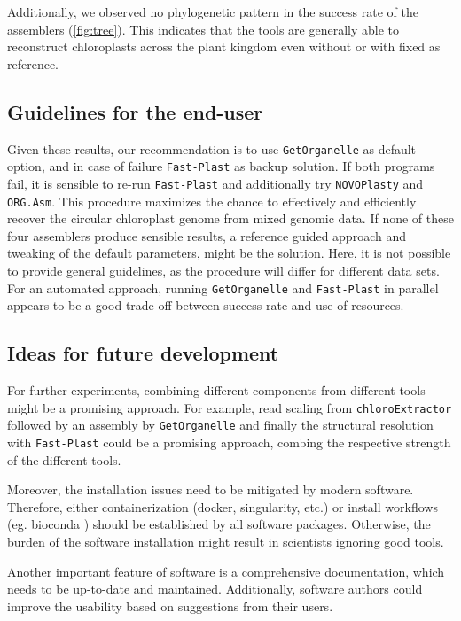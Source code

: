 \documentclass{bmcart}
\newcounter{todocounter}
\newcommand{\ak}[1]
{\stepcounter{todocounter}
 \todo[color=green!40,author=Arthur]{\thetodocounter: #1}
 }
\newcommand{\formatprogramnames}[1]{\texttt{#1}}
\newcommand{\ce}{\formatprogramnames{chloroExtractor}}
\newcommand{\oa}{\formatprogramnames{ORG.Asm}}
\newcommand{\fp}{\formatprogramnames{Fast-Plast}}
\newcommand{\np}{\formatprogramnames{NOVOPlasty}}
\newcommand{\go}{\formatprogramnames{GetOrganelle}}
\begin{document}
Additionally, we observed no phylogenetic pattern in the success rate of the assemblers (\cref{fig:tree}).
This indicates that the tools are generally able to reconstruct chloroplasts across the plant kingdom even without or with fixed  as reference.

\subsection*{Guidelines for the end-user}
Given these results, our recommendation is to use \go{} as default option, and in case of failure \fp{} as backup solution.
If both programs fail, it is sensible to re-run \fp{} and additionally try \np{} and \oa{}.
This procedure maximizes the chance to effectively and efficiently recover the circular chloroplast genome from mixed genomic data.
If none of these four assemblers produce sensible results, a reference guided approach and tweaking of the default parameters, might be the solution.
Here, it is not possible to provide general guidelines, as the procedure will differ for different data sets.
For an automated approach, running \go{} and \fp{} in parallel appears to be a good trade-off between success rate and use of resources.

\subsection*{Ideas for future development}
For further experiments, combining different components from different tools might be a promising approach.
For example, read scaling from \ce{} followed by an assembly by \go{} and finally the structural resolution with \fp{} could be a promising approach, combing the respective strength of the different tools.

Moreover, the installation issues need to be mitigated by modern software.
Therefore, either containerization (docker, singularity, etc.) or install workflows (eg. bioconda \cite{gruening2018}) should be established by all software packages.
Otherwise, the burden of the software installation might result in scientists ignoring good tools.

Another important feature of software is a comprehensive documentation, which needs to be up-to-date and maintained.
Additionally, software authors could improve the usability based on suggestions from their users.
\end{document}
